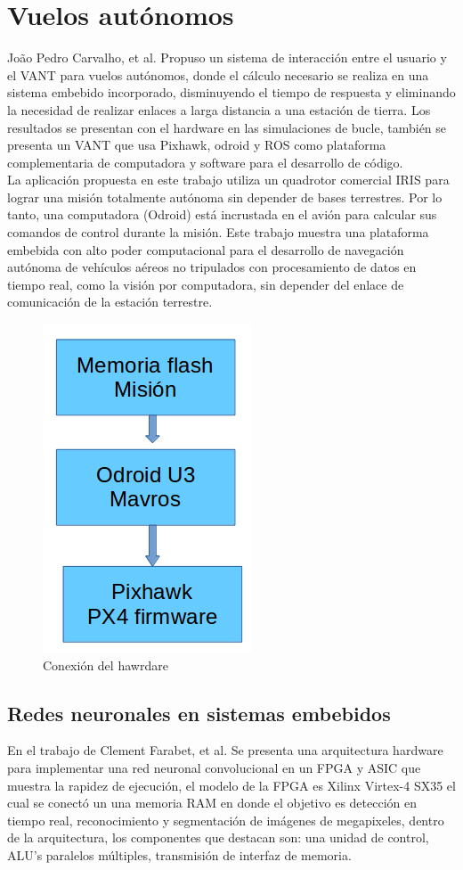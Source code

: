 \documentclass[]{report}
\begin{document}
\section {Vuelos autónomos}
João Pedro Carvalho, et al. Propuso un sistema de interacción entre el usuario y el VANT para vuelos autónomos, donde el cálculo necesario se realiza en una sistema embebido incorporado, disminuyendo el tiempo de respuesta y eliminando la necesidad de realizar enlaces a larga distancia a una estación de tierra. Los resultados se presentan con el hardware en las simulaciones de bucle, también se presenta un VANT que usa Pixhawk, odroid y ROS como plataforma complementaria de computadora y software para el desarrollo de código.\\
La aplicación propuesta en este trabajo utiliza un quadrotor comercial IRIS para lograr una misión totalmente autónoma sin depender de bases terrestres. Por lo tanto, una computadora (Odroid) está incrustada en el avión para calcular sus comandos de control durante la misión.
 Este trabajo muestra una plataforma embebida con alto poder computacional para el desarrollo de navegación autónoma de vehículos aéreos no tripulados con procesamiento de datos  en tiempo real, como la visión por computadora, sin depender del enlace de comunicación de la estación terrestre. \cite{carvalho2017s}
 \begin{figure}[!h]
 	\centering
 	\includegraphics[width=.4\textwidth]{connection}
 	\caption{Conexión del hawrdare}
 	\label{hw connection}
 \end{figure}
 
 
\subsection{Redes neuronales en sistemas embebidos}
En el trabajo de Clement Farabet, et al. Se presenta una arquitectura hardware para implementar una red neuronal convolucional en un FPGA y ASIC que muestra la rapidez de ejecución, el modelo de la FPGA es Xilinx Virtex-4 SX35 el cual se conectó un una memoria RAM en donde el objetivo es detección en tiempo real, reconocimiento y segmentación de imágenes de megapixeles, dentro de la arquitectura, los componentes que destacan son: una unidad de control, ALU's paralelos múltiples, transmisión de interfaz de memoria.\\
\end{document}
